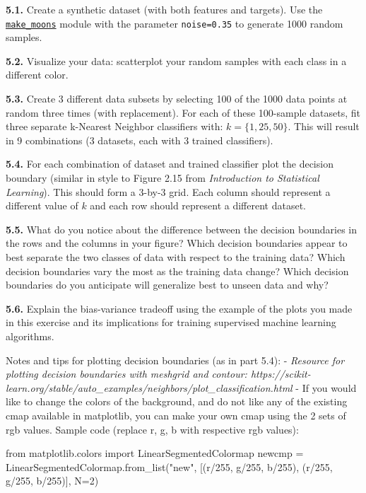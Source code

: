 \documentclass[
  letterpaper,
  DIV=11,
  numbers=noendperiod]{scrartcl}
\newenvironment{Shaded}{\begin{snugshade}}{\end{snugshade}}
\newcommand{\DecValTok}[1]{\textcolor[rgb]{0.68,0.00,0.00}{#1}}
\newcommand{\ImportTok}[1]{\textcolor[rgb]{0.00,0.46,0.62}{#1}}
\newcommand{\NormalTok}[1]{\textcolor[rgb]{0.00,0.23,0.31}{#1}}
\newcommand{\OperatorTok}[1]{\textcolor[rgb]{0.37,0.37,0.37}{#1}}
\newcommand{\StringTok}[1]{\textcolor[rgb]{0.13,0.47,0.30}{#1}}
\begin{document}
\textbf{5.1.} Create a synthetic dataset (with both features and
targets). Use the
\href{http://scikit-learn.org/stable/modules/generated/sklearn.datasets.make_moons.html\#sklearn.datasets.make_moons}{\texttt{make\_moons}}
module with the parameter \texttt{noise=0.35} to generate 1000 random
samples.

\textbf{5.2.} Visualize your data: scatterplot your random samples with
each class in a different color.

\textbf{5.3.} Create 3 different data subsets by selecting 100 of the
1000 data points at random three times (with replacement). For each of
these 100-sample datasets, fit three separate k-Nearest Neighbor
classifiers with: \(k = \{1, 25, 50\}\). This will result in 9
combinations (3 datasets, each with 3 trained classifiers).

\textbf{5.4.} For each combination of dataset and trained classifier
plot the decision boundary (similar in style to Figure 2.15 from
\emph{Introduction to Statistical Learning}). This should form a 3-by-3
grid. Each column should represent a different value of \(k\) and each
row should represent a different dataset.

\textbf{5.5.} What do you notice about the difference between the
decision boundaries in the rows and the columns in your figure? Which
decision boundaries appear to best separate the two classes of data with
respect to the training data? Which decision boundaries vary the most as
the training data change? Which decision boundaries do you anticipate
will generalize best to unseen data and why?

\textbf{5.6.} Explain the bias-variance tradeoff using the example of
the plots you made in this exercise and its implications for training
supervised machine learning algorithms.

Notes and tips for plotting decision boundaries (as in part 5.4): -
\emph{Resource for plotting decision boundaries with meshgrid and
contour:
https://scikit-learn.org/stable/auto\_examples/neighbors/plot\_classification.html}
- If you would like to change the colors of the background, and do not
like any of the existing cmap available in matplotlib, you can make your
own cmap using the 2 sets of rgb values. Sample code (replace r, g, b
with respective rgb values):

\begin{Shaded}
\begin{Highlighting}[]
\ImportTok{from}\NormalTok{ matplotlib.colors }\ImportTok{import}\NormalTok{ LinearSegmentedColormap}
\NormalTok{newcmp }\OperatorTok{=}\NormalTok{ LinearSegmentedColormap.from\_list(}\StringTok{"new"}\NormalTok{, [(r}\OperatorTok{/}\DecValTok{255}\NormalTok{, g}\OperatorTok{/}\DecValTok{255}\NormalTok{, b}\OperatorTok{/}\DecValTok{255}\NormalTok{), (r}\OperatorTok{/}\DecValTok{255}\NormalTok{, g}\OperatorTok{/}\DecValTok{255}\NormalTok{, b}\OperatorTok{/}\DecValTok{255}\NormalTok{)], N}\OperatorTok{=}\DecValTok{2}\NormalTok{)}
\end{Highlighting}
\end{Shaded}
\end{document}
